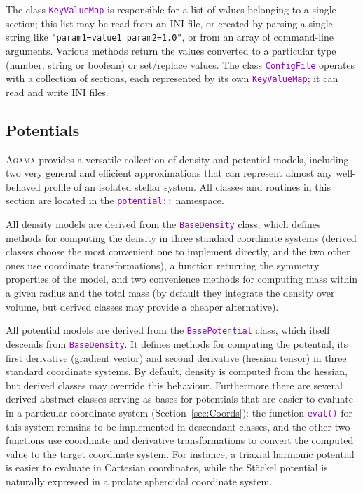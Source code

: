 \documentclass[12pt]{article}
\newcommand{\Agama}{\textsc{Agama}\xspace}
\newcommand{\ttt}[1]{\textcolor{darkviolet}{\texttt{#1}}}
\newcommand{\ppp}[1]{\textcolor{darkolive} {\texttt{#1}}}
\begin{document}
The class \ttt{KeyValueMap} is responsible for a list of values belonging to a single section; this list may be read from an INI file, or created by parsing a single string like \ppp{"param1=value1 param2=1.0"}, or from an array of command-line arguments. Various methods return the values converted to a particular type (number, string or boolean) or set/replace values.
The class \ttt{ConfigFile} operates with a collection of sections, each represented by its own \ttt{KeyValueMap}; it can read and write INI files.


\subsection{Potentials}  \label{sec:Potential}

\Agama provides a versatile collection of density and potential models, including two very general and efficient approximations that can represent almost any well-behaved profile of an isolated stellar system. All classes and routines in this section are located in the \ttt{potential::} namespace.

All density models are derived from the \ttt{BaseDensity} class, which defines methods for computing the density in three standard coordinate systems (derived classes choose the most convenient one to implement directly, and the two other ones use coordinate transformations), a function returning the symmetry properties of the model, and two convenience methods for computing mass within a given radius and the total mass (by default they integrate the density over volume, but derived classes may provide a cheaper alternative).

All potential models are derived from the \ttt{BasePotential} class, which itself descends from \ttt{BaseDensity}. It defines methods for computing the potential, its first derivative (gradient vector) and second derivative (hessian tensor) in three standard coordinate systems. By default, density is computed from the hessian, but derived classes may override this behaviour.
Furthermore there are several derived abstract classes serving as bases for potentials that are easier to evaluate in a particular coordinate system (Section~\ref{sec:Coords}): the function \ttt{eval()} for this system remains to be implemented in descendant classes, and the other two functions use coordinate and derivative transformations to convert the computed value to the target coordinate system.
For instance, a triaxial harmonic potential is easier to evaluate in Cartesian coordinates, while the St\"ackel potential is naturally expressed in a prolate spheroidal coordinate system.
\end{document}
